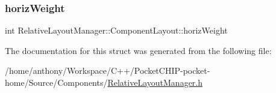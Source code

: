 \subsubsection{\texorpdfstring{horiz\+Weight}{horizWeight}}
{\footnotesize\ttfamily int Relative\+Layout\+Manager\+::\+Component\+Layout\+::horiz\+Weight}



The documentation for this struct was generated from the following file\+:\begin{DoxyCompactItemize}
\item 
/home/anthony/\+Workspace/\+C++/\+Pocket\+C\+H\+I\+P-\/pocket-\/home/\+Source/\+Components/\mbox{\hyperlink{RelativeLayoutManager_8h}{Relative\+Layout\+Manager.\+h}}\end{DoxyCompactItemize}
